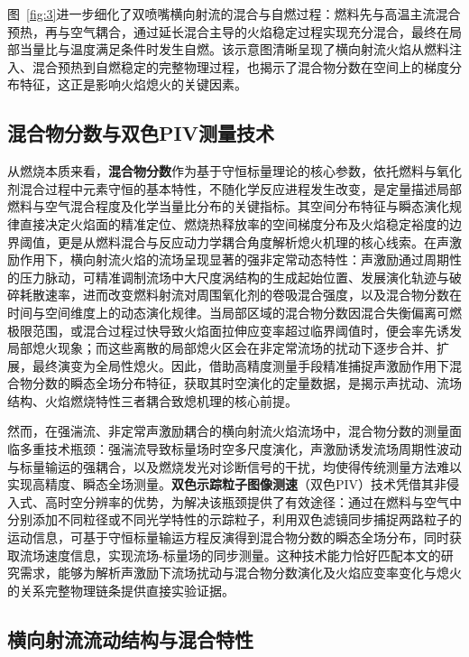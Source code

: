 图~\ref{fig:3}进一步细化了双喷嘴横向射流的混合与自燃过程：燃料先与高温主流混合预热，再与空气耦合，通过延长混合主导的火焰稳定过程实现充分混合，最终在局部当量比与温度满足条件时发生自燃\cite{wang2023}。该示意图清晰呈现了横向射流火焰从燃料注入、混合预热到自燃稳定的完整物理过程，也揭示了混合物分数在空间上的梯度分布特征，这正是影响火焰熄火的关键因素。

\subsection{混合物分数与双色PIV测量技术}

从燃烧本质来看，\textbf{混合物分数}作为基于守恒标量理论的核心参数，依托燃料与氧化剂混合过程中元素守恒的基本特性，不随化学反应进程发生改变，是定量描述局部燃料与空气混合程度及化学当量比分布的关键指标。其空间分布特征与瞬态演化规律直接决定火焰面的精准定位、燃烧热释放率的空间梯度分布及火焰稳定裕度的边界阈值，更是从燃料混合与反应动力学耦合角度解析熄火机理的核心线索。在声激励作用下，横向射流火焰的流场呈现显著的强非定常动态特性：声激励通过周期性的压力脉动，可精准调制流场中大尺度涡结构的生成起始位置、发展演化轨迹与破碎耗散速率，进而改变燃料射流对周围氧化剂的卷吸混合强度，以及混合物分数在时间与空间维度上的动态演化规律。当局部区域的混合物分数因混合失衡偏离可燃极限范围，或混合过程过快导致火焰面拉伸应变率超过临界阈值时，便会率先诱发局部熄火现象；而这些离散的局部熄火区会在非定常流场的扰动下逐步合并、扩展，最终演变为全局性熄火。因此，借助高精度测量手段精准捕捉声激励作用下混合物分数的瞬态全场分布特征，获取其时空演化的定量数据，是揭示声扰动、流场结构、火焰燃烧特性三者耦合致熄机理的核心前提。

然而，在强湍流、非定常声激励耦合的横向射流火焰流场中，混合物分数的测量面临多重技术瓶颈：强湍流导致标量场时空多尺度演化，声激励诱发流场周期性波动与标量输运的强耦合，以及燃烧发光对诊断信号的干扰，均使得传统测量方法难以实现高精度、瞬态全场测量。\textbf{双色示踪粒子图像测速}（双色PIV）技术凭借其非侵入式、高时空分辨率的优势，为解决该瓶颈提供了有效途径：通过在燃料与空气中分别添加不同粒径或不同光学特性的示踪粒子，利用双色滤镜同步捕捉两路粒子的运动信息，可基于守恒标量输运方程反演得到混合物分数的瞬态全场分布，同时获取流场速度信息，实现流场-标量场的同步测量。这种技术能力恰好匹配本文的研究需求，能够为解析声激励下流场扰动与混合物分数演化及火焰应变率变化与熄火的关系完整物理链条提供直接实验证据。

\subsection{横向射流流动结构与混合特性}

